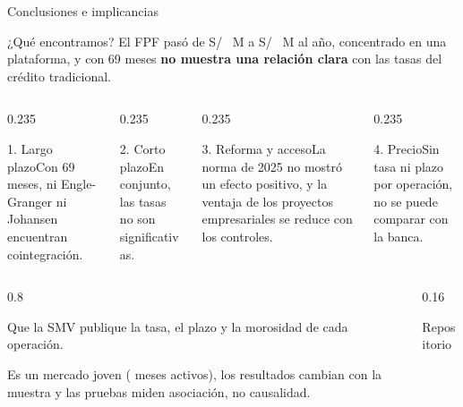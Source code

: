 \begin{frame}{Conclusiones e implicancias}
  \begin{destacada}[halign title=center]{¿Qué encontramos?}
    \centering El FPF pasó de S/~ M a S/~ M al año, concentrado en una plataforma, y con 69 meses \textbf{no muestra una relación clara} con las tasas del crédito tradicional.
  \end{destacada}
  \vspace{-0.1cm}
  \begin{columns}[t]
    \begin{column}{0.235\textwidth}\begin{tarjeta}[equal height group=cc, fonttitle=\bfseries\scriptsize]{1. Largo plazo}\scriptsize Con 69 meses, ni Engle-Granger ni Johansen encuentran cointegración.\end{tarjeta}\end{column}
    \begin{column}{0.235\textwidth}\begin{tarjeta}[equal height group=cc, fonttitle=\bfseries\scriptsize]{2. Corto plazo}\scriptsize En conjunto, las tasas no son significativas.\end{tarjeta}\end{column}
    \begin{column}{0.235\textwidth}\begin{tarjeta}[equal height group=cc, fonttitle=\bfseries\scriptsize]{3. Reforma y acceso}\scriptsize La norma de 2025 no mostró un efecto positivo, y la ventaja de los proyectos empresariales se reduce con los controles.\end{tarjeta}\end{column}
    \begin{column}{0.235\textwidth}\begin{tarjeta}[equal height group=cc, fonttitle=\bfseries\scriptsize]{4. Precio}\scriptsize Sin tasa ni plazo por operación, no se puede comparar con la banca.\end{tarjeta}\end{column}
  \end{columns}
  \vspace{0.05cm}
  \begin{columns}[c]
    \begin{column}{0.8\textwidth}\footnotesize
      \par Que la SMV publique la tasa, el plazo y la morosidad de cada operación.\par\vspace{0.08cm}
      \par Es un mercado joven ( meses activos), los resultados cambian con la muestra y las pruebas miden asociación, no causalidad.
    \end{column}
    \begin{column}{0.16\textwidth}\centering\qrcode[height=1.45cm]{\repositorio}\par{\tiny Repositorio}\end{column}
  \end{columns}
\end{frame}
